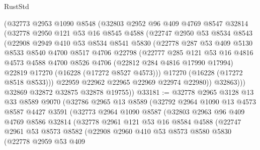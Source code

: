 \begin{lexlean}{RustStd}
\begin{coremodule}
        (@32773
          @2953
          @1090
          @8548
          (@32803
            @2952
            @96
            @409
            @4769
            @8547
            @32814
            (@32778
              @2950
              @121
              @53
              @16
              @8545
              @4588
              (@22747
                @2950
                @53
                @8534
                @8543
                (@22908
                  @2949
                  @410
                  @53
                  @8534
                  @8541
                  @5830
                  (@22778
                    @287
                    @53
                    @409
                    @5130
                    @8533
                    @8540
                    @4700
                    @8517
                    @4706
                    @22798
                    (@22777
                      @285
                      @121
                      @53
                      @16
                      @4816
                      @4573
                      @4588
                      @4700
                      @8526
                      @4706
                      (@22812 @284 @4816 @17990 @17994)
                      @22819
                      @17270
                      (@16228 (@17272 @8527 @4573)))
                    @17270
                    (@16228 (@17272 @8518 @8533)))
                  @22959
                  @22962
                  @22965
                  @22969
                  @22974
                  @22980))
              @32863)))
        @32869
        @32872
        @32875
        @32878
        @19755))
@33181 := @32778
    @2965
    @3128
    @13
    @33
    @8589
    @9070
    (@32786
      @2965
      @13
      @8589
      (@32792
        @2964
        @1090
        @13
        @4573
        @8587
        @4427
        @3591
        (@32773
          @2964
          @1090
          @8587
          (@32803
            @2963
            @96
            @409
            @4769
            @8586
            @32814
            (@32778
              @2961
              @121
              @53
              @16
              @8584
              @4588
              (@22747
                @2961
                @53
                @8573
                @8582
                (@22908
                  @2960
                  @410
                  @53
                  @8573
                  @8580
                  @5830
                  (@22778
                    @2959
                    @53
                    @409

\end{coremodule}
\end{lexlean}
